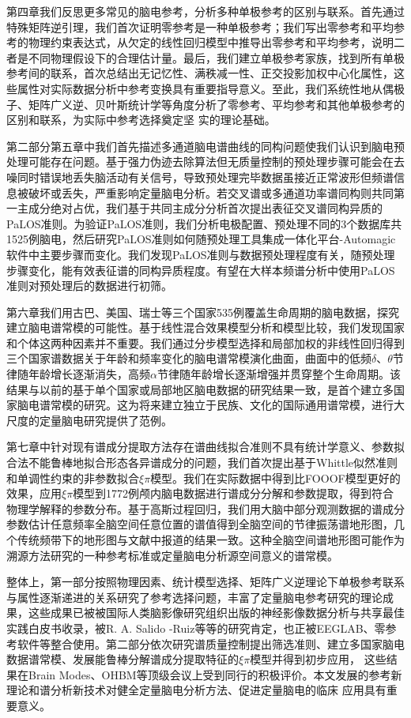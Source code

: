 第四章我们反思更多常见的脑电参考，分析多种单极参考的区别与联系。首先通过特殊矩阵逆引理，我们首次证明零参考是一种单极参考；我们写出零参考和平均参考的物理约束表达式，从欠定的线性回归模型中推导出零参考和平均参考，说明二者是不同物理假设下的合理估计量。最后，我们建立单极参考家族，找到所有单极参考间的联系，首次总结出无记忆性、满秩减一性、正交投影加权中心化属性，这些属性对实际数据分析中参考变换具有重要指导意义。至此，我们系统性地从偶极子、矩阵广义逆、贝叶斯统计学等角度分析了零参考、平均参考和其他单极参考的区别和联系，为实际中参考选择奠定坚
实的理论基础。

第二部分第五章中我们首先描述多通道脑电谱曲线的同构问题使我们认识到脑电预处理可能存在问题。基于强力伪迹去除算法但无质量控制的预处理步骤可能会在去噪同时错误地丢失脑活动有关信号，导致预处理完毕数据虽接近正常波形但频谱信息被破坏或丢失，严重影响定量脑电分析。若交叉谱或多通道功率谱同构则共同第一主成分绝对占优，我们基于共同主成分分析首次提出表征交叉谱同构异质的PaLOS准则。为验证PaLOS准则，我们分析电极配置、预处理不同的3个数据库共1525例脑电，然后研究PaLOS准则如何随预处理工具集成一体化平台-Automagic软件中主要步骤而变化。我们发现PaLOS准则与数据预处理程度有关，随预处理步骤变化，能有效表征谱的同构异质程度。有望在大样本频谱分析中使用PaLOS准则对预处理后的数据进行初筛。

第六章我们用古巴、美国、瑞士等三个国家535例覆盖生命周期的脑电数据，探究建立脑电谱常模的可能性。基于线性混合效果模型分析和模型比较，我们发现国家和个体这两种因素并不重要。我们通过分步模型选择和局部加权的非线性回归得到三个国家谱数据关于年龄和频率变化的脑电谱常模演化曲面，曲面中的低频$\delta$、$\theta$节律随年龄增长逐渐消失，高频$\alpha$节律随年龄增长逐渐增强并贯穿整个生命周期。该结果与以前的基于单个国家或局部地区脑电数据的研究结果一致，是首个建立多国家脑电谱常模的研究。这为将来建立独立于民族、文化的国际通用谱常模，进行大尺度的定量脑电研究提供了范例。

第七章中针对现有谱成分提取方法存在谱曲线拟合准则不具有统计学意义、参数拟合法不能鲁棒地拟合形态各异谱成分的问题，我们首次提出基于Whittle似然准则和单调性约束的非参数拟合$\xi\pi$模型。我们在实际数据中得到比FOOOF模型更好的效果，应用$\xi\pi$模型到1772例颅内脑电数据进行谱成分分解和参数提取，得到符合物理学解释的参数分布。基于高斯过程回归，我们用大脑中部分观测数据的谱成分参数估计任意频率全脑空间任意位置的谱值得到全脑空间的节律振荡谱地形图，几个传统频带下的地形图与文献中报道的结果一致。这种全脑空间谱地形图可能作为溯源方法研究的一种参考标准或定量脑电分析源空间意义的谱常模。

整体上，第一部分按照物理因素、统计模型选择、矩阵广义逆理论下单极参考联系与属性逐渐递进的关系研究了参考选择问题，丰富了定量脑电参考研究的理论成果，这些成果已被被国际人类脑影像研究组织出版的神经影像数据分析与共享最佳实践白皮书收录，被R. A. Salido
-Ruiz等等的研究肯定，也正被EEGLAB、零参考软件等整合使用。第二部分依次研究谱质量控制提出筛选准则、建立多国家脑电数据谱常模、发展能鲁棒分解谱成分提取特征的$\xi\pi$模型并得到初步应用，
这些结果在Brain Modes、OHBM等顶级会议上受到同行的积极评价。本文发展的参考新理论和谱分析新技术对健全定量脑电分析方法、促进定量脑电的临床
应用具有重要意义。

